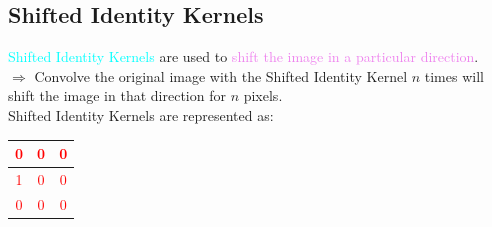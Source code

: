 \documentclass{book}
\begin{document}
\subsection{Shifted Identity Kernels}
\textcolor{cyan}{Shifted Identity Kernels} are used to \textcolor{violet}{shift the image in a particular direction}.\\
$\Rightarrow$ Convolve the original image with the Shifted Identity Kernel $n$ times will shift the image in that direction for $n$ pixels.\\
Shifted Identity Kernels are represented as:
\begin{center}
    \textcolor{red}{
    \begin{tabular}{|c|c|c|}
        \hline
        0 & 0 & 0 \\
        \hline
        1 & 0 & 0 \\
        \hline
        0 & 0 & 0 \\
        \hline
    \end{tabular}}
\end{center}
\end{document}
